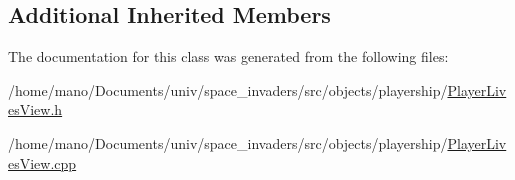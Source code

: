 \subsection*{Additional Inherited Members}


The documentation for this class was generated from the following files\+:\begin{DoxyCompactItemize}
\item 
/home/mano/\+Documents/univ/space\+\_\+invaders/src/objects/playership/\hyperlink{PlayerLivesView_8h}{Player\+Lives\+View.\+h}\item
/home/mano/\+Documents/univ/space\+\_\+invaders/src/objects/playership/\hyperlink{PlayerLivesView_8cpp}{Player\+Lives\+View.\+cpp}\end{DoxyCompactItemize}
